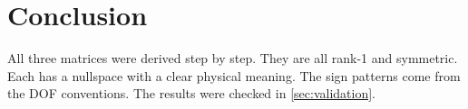 \documentclass[11pt, a4paper]{article}
\begin{document}
\section{Conclusion}

All three matrices were derived step by step.  They are all rank-1 and symmetric.  Each has a nullspace with a clear physical meaning.  The sign patterns come from the DOF conventions.  The results were checked in \cref{sec:validation}.
\end{document}
